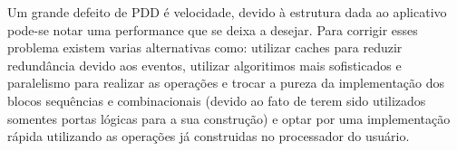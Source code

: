Um grande defeito de PDD é velocidade, devido à estrutura dada ao aplicativo pode-se notar uma performance que se deixa a desejar. Para corrigir esses problema existem varias alternativas como: utilizar caches para reduzir redundância devido aos eventos, utilizar algoritimos mais sofisticados e paralelismo para realizar as operações e trocar a pureza da implementação dos blocos sequências e combinacionais (devido ao fato de terem sido utilizados somentes portas lógicas para a sua construção) e optar por uma implementação rápida utilizando as operações já construidas no processador do usuário.




